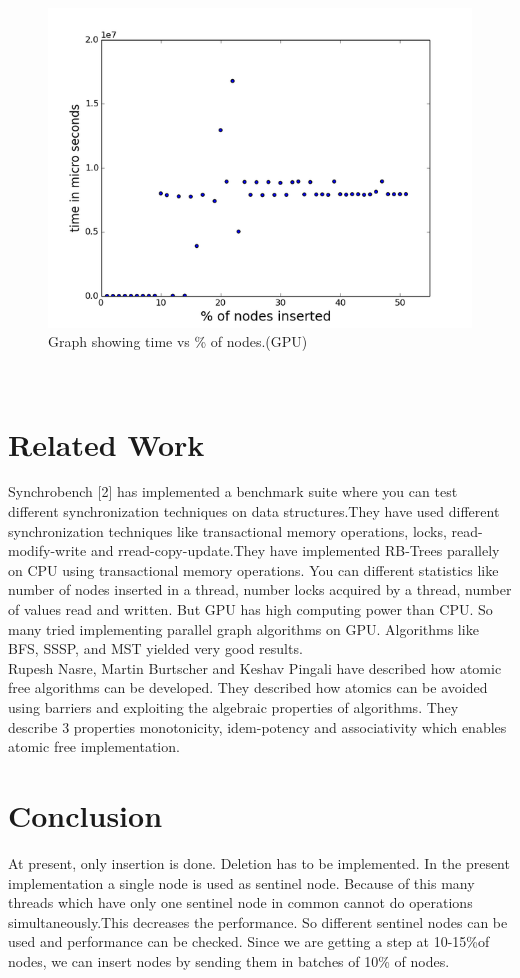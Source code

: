 \documentclass[BTech]{iitmdiss}
\begin{document}
\begin{figure}[h]
    \centering
    \centerline{\includegraphics{rsz_graph_gpu.png}}
    \caption{Graph showing time vs \% of nodes.(GPU)}
    \label{fig:graph_gpu}
\end{figure}\\

\chapter{Related Work}
Synchrobench [2] has implemented a benchmark suite where you can test different synchronization techniques on data structures.They have used different synchronization techniques like transactional memory operations, locks, read-modify-write and rread-copy-update.They have implemented RB-Trees parallely on CPU using transactional memory operations. You can different statistics like number of nodes inserted in a thread, number locks acquired by a thread, number of values read and written. But GPU has high computing power than CPU. So many tried implementing parallel graph algorithms on GPU. Algorithms like BFS, SSSP, and MST yielded very good results.\\ 
Rupesh Nasre, Martin Burtscher and Keshav Pingali have described how atomic free algorithms can be developed. They described how atomics can be avoided using barriers and exploiting the algebraic properties of algorithms. They describe 3 properties monotonicity, idem-potency and associativity which enables atomic free implementation.
\chapter{Conclusion}
At present, only insertion is done. Deletion has to be implemented. In the present implementation a single node is used as sentinel node. Because of this many threads which have only one sentinel node in common cannot do operations simultaneously.This decreases the performance. So different sentinel nodes can be used and performance can be checked. Since we are getting a step at 10-15\%of nodes, we can insert nodes by sending them in batches of 10\% of nodes.
\end{document}
